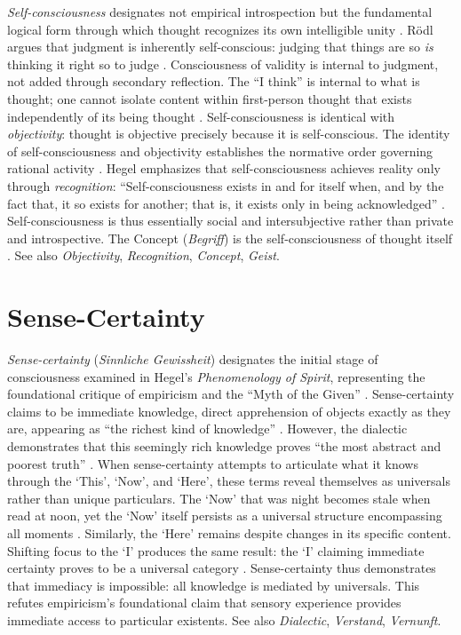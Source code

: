 \documentclass{book}
\begin{document}
\textit{Self-consciousness} designates not empirical introspection but the fundamental logical form through which thought recognizes its own intelligible unity \parencite{Rodl:2007aa, Negarestani2018}. R\"odl argues that judgment is inherently self-conscious: judging that things are so \textit{is} thinking it right so to judge \parencite[39]{Rodl:2018aa}. Consciousness of validity is internal to judgment, not added through secondary reflection. The ``I think'' is internal to what is thought; one cannot isolate content within first-person thought that exists independently of its being thought \parencite{Rodl:2018aa}. Self-consciousness is identical with \textit{objectivity}: thought is objective precisely because it is self-conscious. The identity of self-consciousness and objectivity establishes the normative order governing rational activity \parencite{Rodl:2007aa, Negarestani2018}. Hegel emphasizes that self-consciousness achieves reality only through \textit{recognition}: ``Self-consciousness exists in and for itself when, and by the fact that, it so exists for another; that is, it exists only in being acknowledged'' \parencite[\S 178]{hegel1977phenomenology}. Self-consciousness is thus essentially social and intersubjective rather than private and introspective. The Concept (\textit{Begriff}) is the self-consciousness of thought itself \parencite{Rodl:2019aa}. See also \textit{Objectivity}, \textit{Recognition}, \textit{Concept}, \textit{Geist}.

\section{Sense-Certainty}

\textit{Sense-certainty} (\textit{Sinnliche Gewissheit}) designates the initial stage of consciousness examined in Hegel's \textit{Phenomenology of Spirit}, representing the foundational critique of empiricism and the ``Myth of the Given'' \parencite{hegel1977phenomenology, Brandom:2019aa}. Sense-certainty claims to be immediate knowledge, direct apprehension of objects exactly as they are, appearing as ``the richest kind of knowledge'' \parencite[\S 90]{hegel1977phenomenology}. However, the dialectic demonstrates that this seemingly rich knowledge proves ``the most abstract and poorest truth'' \parencite[\S 91]{hegel1977phenomenology}. When sense-certainty attempts to articulate what it knows through the `This', `Now', and `Here', these terms reveal themselves as universals rather than unique particulars. The `Now' that was night becomes stale when read at noon, yet the `Now' itself persists as a universal structure encompassing all moments \parencite[\S 96]{hegel1977phenomenology}. Similarly, the `Here' remains despite changes in its specific content. Shifting focus to the `I' produces the same result: the `I' claiming immediate certainty proves to be a universal category \parencite[\S 102]{hegel1977phenomenology}. Sense-certainty thus demonstrates that immediacy is impossible: all knowledge is mediated by universals. This refutes empiricism's foundational claim that sensory experience provides immediate access to particular existents. See also \textit{Dialectic}, \textit{Verstand}, \textit{Vernunft}.
\end{document}

